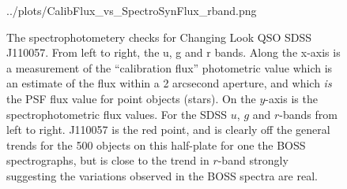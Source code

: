 \documentclass{emulateapj}
\begin{document}
\begin{figure}
  {../plots/CalibFlux_vs_SpectroSynFlux_rband.png}
  \centering
  \caption[]{The spectrophotometery checks for Changing Look QSO SDSS J110057. 
    From left to right, the u, g and r bands. 
    Along the x-axis is a measurement of the ``calibration flux'' photometric value 
    which is an estimate of the flux within a 2 arcsecond aperture, and which {\it is} 
    the PSF flux value for point objects (stars). On the $y$-axis is the spectrophotometric
    flux values. For the SDSS $u$, $g$ and $r$-bands from left to right. 
J110057 is the red point, and is clearly off the general trends for the 500 objects 
on this half-plate for one the BOSS spectrographs, but is close to the trend in 
$r$-band strongly suggesting the variations observed in the BOSS spectra are real.} 
 \label{fig:w1100m0052_halpha}
\end{figure}



 

\end{document}
